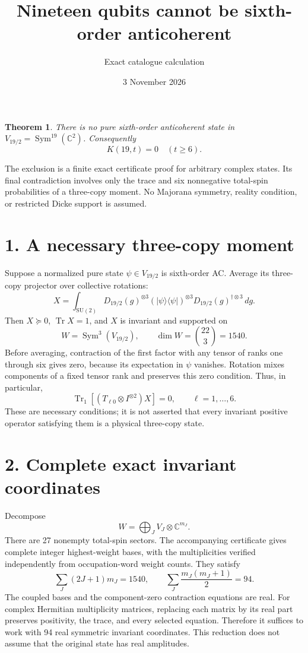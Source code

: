 \documentclass[11pt]{article}
\newtheorem{theorem}{Theorem}
\newcommand{\Tr}{\operatorname{Tr}}
\newcommand{\Sym}{\operatorname{Sym}}
\begin{document}
\title{Nineteen qubits cannot be sixth-order anticoherent}
\author{Exact catalogue calculation}
\date{3 November 2026}
\maketitle
\begin{theorem}
There is no pure sixth-order anticoherent state in
$V_{19/2}=\Sym^{19}(\mathbb C^2)$. Consequently
\[
 \boxed{K(19,t)=0\quad(t\ge6).}
\]
\end{theorem}
The exclusion is a finite exact certificate proof for arbitrary complex
states. Its final contradiction involves only the trace and six nonnegative
total-spin probabilities of a three-copy moment. No Majorana symmetry,
reality condition, or restricted Dicke support is assumed.

\section*{1. A necessary three-copy moment}
Suppose a normalized pure state $\psi\in V_{19/2}$ is sixth-order AC. Average its
three-copy projector over collective rotations:
\[
 X=\int_{\mathrm{SU}(2)}D_{19/2}(g)^{\otimes3}
 (|\psi\rangle\langle\psi|)^{\otimes3}
 D_{19/2}(g)^{\dagger\otimes3}\,dg.
\]
Then $X\succeq0$, $\Tr X=1$, and $X$ is invariant and supported on
\[
 W=\Sym^3(V_{19/2}),\qquad \dim W=\binom{22}{3}=1540.
\]
Before averaging, contraction of the first factor with any tensor of ranks
one through six gives zero, because its expectation in $\psi$ vanishes.
Rotation mixes components of a fixed tensor rank and preserves this zero
condition. Thus, in particular,
\begin{equation}\label{contractions}
 \Tr_1[(T_{\ell0}\otimes I^{\otimes2})X]=0,
 \qquad \ell=1,\ldots,6.
\end{equation}
These are necessary conditions; it is not asserted that every invariant
positive operator satisfying them is a physical three-copy state.

\section*{2. Complete exact invariant coordinates}
Decompose
\[
 W=\bigoplus_J V_J\otimes\mathbb C^{m_J}.
\]
There are 27 nonempty total-spin sectors. The accompanying certificate gives
complete integer highest-weight bases, with the multiplicities verified
independently from occupation-word weight counts. They satisfy
\[
 \sum_J(2J+1)m_J=1540,\qquad
 \sum_J\frac{m_J(m_J+1)}2=94.
\]
The coupled bases and the component-zero contraction equations are real.
For complex Hermitian multiplicity matrices, replacing each matrix by its
real part preserves positivity, the trace, and every selected equation.
Therefore it suffices to work with 94 real symmetric invariant coordinates.
This reduction does not assume that the original state has real amplitudes.
\end{document}
